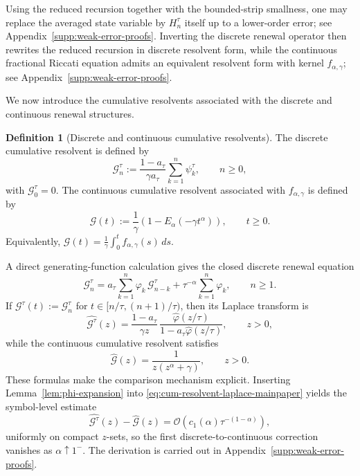 \documentclass[letterpaper]{article}
\numberwithin{equation}{section}
\theoremstyle{definition}
\newtheorem{definition}[theorem]{Definition}
\theoremstyle{remark}
\begin{document}
Using the reduced recursion together with the bounded-strip smallness, one may replace the averaged state variable by $H_n^\tau$ itself up to a lower-order error; see Appendix~\ref{supp:weak-error-proofs}. Inverting the discrete renewal operator then rewrites the reduced recursion in discrete resolvent form, while the continuous fractional Riccati equation admits an equivalent resolvent form with kernel $f_{\alpha,\gamma}$; see Appendix~\ref{supp:weak-error-proofs}.

We now introduce the cumulative resolvents associated with the discrete and
continuous renewal structures.

\begin{definition}[Discrete and continuous cumulative resolvents]
\label{def:cum-resolvents}
The discrete cumulative resolvent is defined by
\[
  \mathcal G_n^\tau
  :=
  \frac{1-a_\tau}{\gamma a_\tau}
  \sum_{k=1}^n\psi_k^\tau,
  \qquad n\ge0,
\]
with $\mathcal G_0^\tau=0$.
The continuous cumulative resolvent associated with $f_{\alpha,\gamma}$ is
defined by
\[
  \mathcal G(t)
  :=
  \frac1\gamma\left(1-E_\alpha(-\gamma t^\alpha)\right),
  \qquad t\ge0.
\]
Equivalently,
$\mathcal G(t)=\frac1\gamma\int_0^t f_{\alpha,\gamma}(s)\,ds$.
\end{definition}

A direct generating-function calculation gives the closed discrete renewal
equation
\begin{equation}\label{eq:cum-resolvent-renewal-mainpaper}
  \mathcal G_n^\tau
  =
  a_\tau\sum_{k=1}^n\varphi_k\,\mathcal G_{n-k}^\tau
  +\tau^{-\alpha}\sum_{k=1}^n\varphi_k,
  \qquad n\ge1.
\end{equation}
If $\mathcal G^\tau(t):=\mathcal G_n^\tau$ for
$t\in[n/\tau,(n+1)/\tau)$, then its Laplace transform is
\begin{equation}\label{eq:cum-resolvent-laplace-mainpaper}
  \widehat{\mathcal G^\tau}(z)
  =
  \frac{1-a_\tau}{\gamma z}\,
  \frac{\hat\varphi(z/\tau)}{1-a_\tau\hat\varphi(z/\tau)},
  \qquad z>0,
\end{equation}
while the continuous cumulative resolvent satisfies
\begin{equation}\label{eq:cum-resolvent-laplace-cont-mainpaper}
  \widehat{\mathcal G}(z)=\frac{1}{z(z^\alpha+\gamma)},
  \qquad z>0.
\end{equation}
These formulas make the comparison mechanism explicit. Inserting
Lemma~\ref{lem:phi-expansion} into
\eqref{eq:cum-resolvent-laplace-mainpaper} yields the symbol-level estimate
\[
  \widehat{\mathcal G^\tau}(z)-\widehat{\mathcal G}(z)
  = \mathcal O\!\left(c_1(\alpha)\tau^{-(1-\alpha)}\right),
\]
uniformly on compact $z$-sets, so the first discrete-to-continuous correction
vanishes as $\alpha\uparrow1^-$. The derivation is carried out in Appendix~\ref{supp:weak-error-proofs}.
\end{document}
